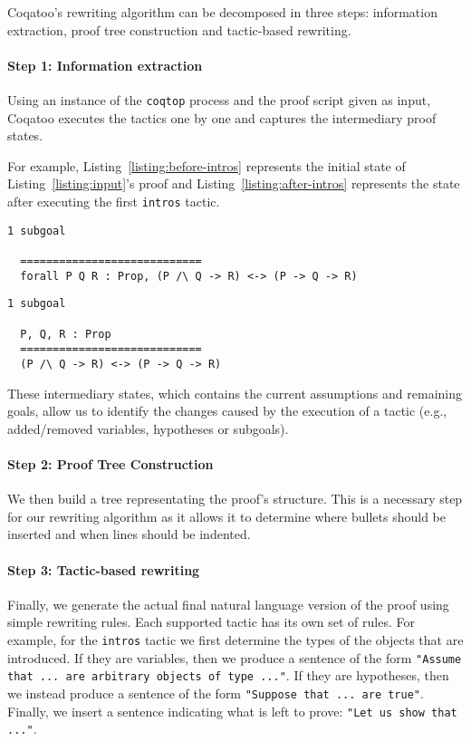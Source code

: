 \documentclass[sigplan,screen,9pt]{acmart}
\begin{document}
Coqatoo's rewriting algorithm can be decomposed in three steps: information extraction, proof tree construction and tactic-based rewriting. 

\paragraph{Step 1: Information extraction}
Using an instance of the \texttt{coqtop} process and the proof script given as input, Coqatoo executes the tactics one by one and captures the intermediary proof states. 

For example, Listing~\ref{listing:before-intros} represents the initial state of Listing~\ref{listing:input}'s proof and Listing~\ref{listing:after-intros} represents the state after executing the first \lstinline{intros} tactic.
\begin{lstlisting}[label=listing:before-intros, captionpos=b,caption={State before executing the first intros tactic}]
  1 subgoal
  
  ============================
  forall P Q R : Prop, (P /\ Q -> R) <-> (P -> Q -> R)
\end{lstlisting}
\pagebreak
\begin{lstlisting}[label=listing:after-intros,captionpos=b,caption={State after executing the first intros tactic}]
  1 subgoal
  
  P, Q, R : Prop
  ============================
  (P /\ Q -> R) <-> (P -> Q -> R)
\end{lstlisting}
These intermediary states, which contains the current assumptions and remaining goals, allow us to identify the changes caused by the execution of a tactic (e.g., added/removed variables, hypotheses or subgoals).

\paragraph{Step 2: Proof Tree Construction}
We then build a tree representating the proof's structure. This is a necessary step for our rewriting algorithm as it allows it to determine where bullets should be inserted and when lines should be indented.

\paragraph{Step 3: Tactic-based rewriting}
Finally, we generate the actual final natural language version of the proof using simple rewriting rules. Each supported tactic has its own set of rules. For example, for the \lstinline{intros} tactic we first determine the types of the objects that are introduced. If they are variables, then we produce a sentence of the form \lstinline{"Assume that ... are arbitrary objects of type ..."}. If they are hypotheses, then we instead produce a sentence of the form \lstinline{"Suppose that ... are true"}. Finally, we insert a sentence indicating what is left to prove: \lstinline{"Let us show that ..."}. 
\end{document}
